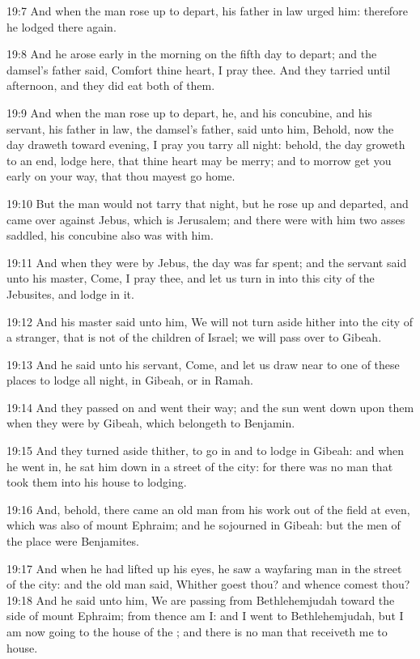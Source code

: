 19:7 And when the man rose up to depart, his father in law urged him: therefore he lodged there again.

19:8 And he arose early in the morning on the fifth day to depart; and the damsel's father said, Comfort thine heart, I pray thee. And they tarried until afternoon, and they did eat both of them.

19:9 And when the man rose up to depart, he, and his concubine, and his servant, his father in law, the damsel's father, said unto him, Behold, now the day draweth toward evening, I pray you tarry all night: behold, the day groweth to an end, lodge here, that thine heart may be merry; and to morrow get you early on your way, that thou mayest go home.

19:10 But the man would not tarry that night, but he rose up and departed, and came over against Jebus, which is Jerusalem; and there were with him two asses saddled, his concubine also was with him.

19:11 And when they were by Jebus, the day was far spent; and the servant said unto his master, Come, I pray thee, and let us turn in into this city of the Jebusites, and lodge in it.

19:12 And his master said unto him, We will not turn aside hither into the city of a stranger, that is not of the children of Israel; we will pass over to Gibeah.

19:13 And he said unto his servant, Come, and let us draw near to one of these places to lodge all night, in Gibeah, or in Ramah.

19:14 And they passed on and went their way; and the sun went down upon them when they were by Gibeah, which belongeth to Benjamin.

19:15 And they turned aside thither, to go in and to lodge in Gibeah: and when he went in, he sat him down in a street of the city: for there was no man that took them into his house to lodging.

19:16 And, behold, there came an old man from his work out of the field at even, which was also of mount Ephraim; and he sojourned in Gibeah: but the men of the place were Benjamites.

19:17 And when he had lifted up his eyes, he saw a wayfaring man in the street of the city: and the old man said, Whither goest thou? and whence comest thou?  19:18 And he said unto him, We are passing from Bethlehemjudah toward the side of mount Ephraim; from thence am I: and I went to Bethlehemjudah, but I am now going to the house of the \LORD; and there is no man that receiveth me to house.


